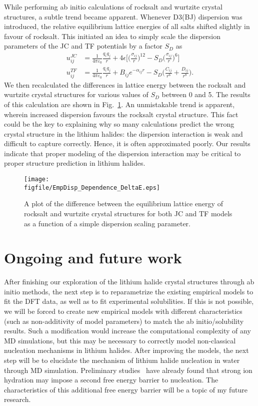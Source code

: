 \documentclass[titlepage,11pt]{article}
\newcommand{\figfile}{C:/Users/Hayden/Documents/Patey_Lab/ThesisCodeBase/Manuscript_1.0/figures}
\begin{document}
While performing ab initio calculations of rocksalt and wurtzite crystal structures, a subtle trend became apparent. Whenever D3(BJ) dispersion was introduced, the relative equilibrium lattice energies of all salts shifted slightly in favour of rocksalt. This initiated an idea to simply scale the dispersion parameters of the JC and TF potentials by a factor $S_{D}$ as
\begin{align}
	u^{JC}_{ij} &= \frac{1}{4 \pi \varepsilon_{0}}\frac{q_{i} q_{j} }{r} + 4 \epsilon \bigg[ \big(\frac{\sigma_{ij}}{r} \big)^{12} - S_{D}\big(\frac{\sigma_{ij}}{r} \big)^{6} \bigg]\\
	u^{TF}_{ij} &= \frac{1}{4 \pi \varepsilon_{0}}\frac{q_{i} q_{j} }{r} + B_{ij} e^{-\alpha_{ij}r} - S_{D}\bigg(\frac{C_{ij}}{r^{6}} + \frac{D_{ij}}{r^{8}}\bigg).
\end{align}
We then recalculated the differences in lattice energy between the rocksalt and wurtzite crystal structures for various values of $S_{D}$ between 0 and 5. The results of this calculation are shown in Fig.~\ref{fig:Emp_Dispersion}. An unmistakable trend is apparent, wherein increased dispersion favours the rocksalt crystal structure. This fact could be the key to explaining why so many calculations predict the wrong crystal structure in the lithium halides: the dispersion interaction is weak and difficult to capture correctly. Hence, it is often approximated poorly. Our results indicate that proper modeling of the dispersion interaction may be critical to proper structure prediction in lithium halides.
\begin{figure}
	\texttt{[image: \\figfile/EmpDisp\_Dependence\_DeltaE.eps]}
	\caption{\label{fig:Emp_Dispersion} A plot of the difference between the equilibrium lattice energy of rocksalt and wurtzite crystal structures for both JC and TF models as a function of a simple dispersion scaling parameter.}
\end{figure}

\section{Ongoing and future work}

After finishing our exploration of the lithium halide crystal structures through ab initio methods, the next step is to reparametrize the existing empirical models to fit the DFT data, as well as to fit experimental solubilities. If this is not possible, we will be forced to create new empirical models with different characteristics (such as non-additivity of model parameters) to match the ab initio/solubility results. Such a modification would increase the computational complexity of any MD simulations, but this may be necessary to correctly model non-classical nucleation mechanisms in lithium halides. After improving the models, the next step will be to elucidate the mechanism of lithium halide nucleation in water through MD simulation. Preliminary studies~\cite{Lanaro2018} have already found that strong ion hydration may impose a second free energy barrier to nucleation. The characteristics of this additional free energy barrier will be a topic of my future research.
\end{document}
